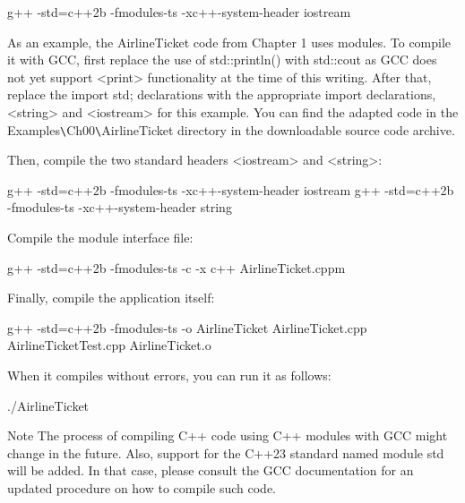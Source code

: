 \begin{shell}
g++ -std=c++2b -fmodules-ts -xc++-system-header iostream
\end{shell}

As an example, the AirlineTicket code from Chapter 1 uses modules. To compile it with GCC, first replace the use of std::println() with std::cout as GCC does not yet support <print> functionality at the time of this writing. After that, replace the import std; declarations with the appropriate import declarations, <string> and <iostream> for this example. You can find the adapted code in the Examples\verb|\|Ch00\verb|\|AirlineTicket directory in the downloadable source code archive.

Then, compile the two standard headers <iostream> and <string>:

\begin{shell}
g++ -std=c++2b -fmodules-ts -xc++-system-header iostream
g++ -std=c++2b -fmodules-ts -xc++-system-header string
\end{shell}

Compile the module interface file:

\begin{shell}
g++ -std=c++2b -fmodules-ts -c -x c++ AirlineTicket.cppm
\end{shell}

Finally, compile the application itself:

\begin{shell}
g++ -std=c++2b -fmodules-ts -o AirlineTicket AirlineTicket.cpp AirlineTicketTest.cpp AirlineTicket.o
\end{shell}

When it compiles without errors, you can run it as follows:

\begin{shell}
./AirlineTicket
\end{shell}

\begin{myNotic}{Note}
The process of compiling C++ code using C++ modules with GCC might change in the future. Also, support for the C++23 standard named module std will be added. In that case, please consult the GCC documentation for an updated procedure on how to compile such code.
\end{myNotic}







